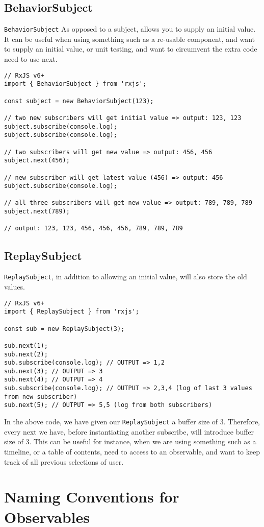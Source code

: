 \subsection{BehaviorSubject}
\lstinline{BehaviorSubject} As opposed to a subject, allows you to supply an 
initial value. It can be useful when using something such as a re-usable 
component, and want to supply an initial value, or unit testing, and want 
to circumvent the extra code need to use next. 
\begin{lstlisting}
// RxJS v6+
import { BehaviorSubject } from 'rxjs';

const subject = new BehaviorSubject(123);

// two new subscribers will get initial value => output: 123, 123
subject.subscribe(console.log);
subject.subscribe(console.log);

// two subscribers will get new value => output: 456, 456
subject.next(456);

// new subscriber will get latest value (456) => output: 456
subject.subscribe(console.log);

// all three subscribers will get new value => output: 789, 789, 789
subject.next(789);

// output: 123, 123, 456, 456, 456, 789, 789, 789  
\end{lstlisting}

\subsection{ReplaySubject}
\lstinline{ReplaySubject}, in addition to allowing an initial value, will also 
store the old values. 
\begin{lstlisting}
// RxJS v6+
import { ReplaySubject } from 'rxjs';

const sub = new ReplaySubject(3);

sub.next(1);
sub.next(2);
sub.subscribe(console.log); // OUTPUT => 1,2
sub.next(3); // OUTPUT => 3
sub.next(4); // OUTPUT => 4
sub.subscribe(console.log); // OUTPUT => 2,3,4 (log of last 3 values from new subscriber)
sub.next(5); // OUTPUT => 5,5 (log from both subscribers)  
\end{lstlisting}

In the above code, we have given our \lstinline{ReplaySubject} a buffer size of
3. Therefore, every next we have, before instantiating another subscribe, will 
introduce buffer size of 3. This can be useful for instance, when we are using something 
such as a timeline, or a table of contents, need to access to an observable, and want to 
keep track of all previous selections of user. 

\section{Naming Conventions for Observables}